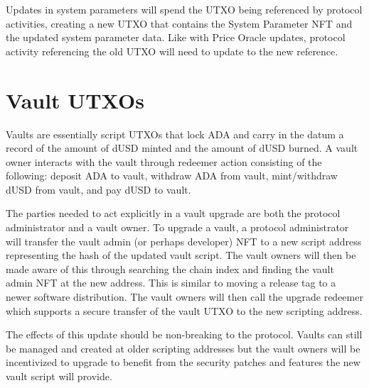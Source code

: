 \documentclass[12pt]{article}
\begin{document}
Updates in system parameters will spend the UTXO being referenced by protocol activities, creating a new UTXO that contains the System Parameter NFT and the updated system parameter data. Like with Price Oracle updates, protocol activity referencing the old UTXO will need to update to the new reference.

\section{Vault UTXOs}

Vaults are essentially script UTXOs that lock ADA and carry in the datum a record of the amount of dUSD minted and the amount of dUSD burned. A vault owner interacts with the vault through redeemer action consisting of the following: deposit ADA to vault, withdraw ADA from vault, mint/withdraw dUSD from vault, and pay dUSD to vault. 

The parties needed to act explicitly in a vault upgrade are both the protocol administrator and a vault owner. To upgrade a vault, a protocol administrator will transfer the vault admin (or perhaps developer) NFT to a new script address representing the hash of the updated vault script. The vault owners will then be made aware of this through searching the chain index and finding the vault admin NFT at the new address. This is similar to moving a release tag to a newer software distribution. The vault owners will then call the upgrade redeemer which supports a secure transfer of the vault UTXO to the new scripting address.

The effects of this update should be non-breaking to the protocol. Vaults can still be managed and created at older scripting addresses but the vault owners will be incentivized to upgrade to benefit from the security patches and features the new vault script will provide.
\end{document}
